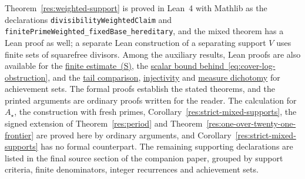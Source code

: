 \documentclass[11pt]{article}
\begin{document}
\evidenceparagraph{\evidencerecordurl}
Theorem~\ref{res:weighted-support} is proved in Lean~4 with Mathlib as
the declarations \texttt{divisibilityWeightedClaim} and
\texttt{finitePrimeWeighted\_fixedBase\_hereditary}, and the mixed
theorem has a Lean proof as well; a separate Lean construction of a
separating support $V$ uses finite sets of squarefree divisors. Among
the auxiliary results, Lean proofs are also available for the
\href{https://github.com/wcook04/plectis-erdos/blob/c91562bd574a387cde904481e609c7b4cacebb14/lean/ErdosProblems/Erdos257/PaperCompleteR8/DyadicKernel.lean\#L206}{finite estimate~(S)}, the
\href{https://github.com/wcook04/plectis-erdos/blob/c91562bd574a387cde904481e609c7b4cacebb14/lean/ErdosProblems/Erdos257/PaperCompleteR7/CoverKernel.lean\#L170}{scalar bound behind~\eqref{eq:cover-log-obstruction}},
and the \href{https://github.com/wcook04/plectis-erdos/blob/c91562bd574a387cde904481e609c7b4cacebb14/lean/ErdosProblems/Erdos257/MersenneSubseriesRigidity.lean\#L30}{tail comparison},
\href{https://github.com/wcook04/plectis-erdos/blob/c91562bd574a387cde904481e609c7b4cacebb14/lean/ErdosProblems/Erdos257/MersenneSubseriesRigidity.lean\#L54}{injectivity} and
\href{https://github.com/wcook04/plectis-erdos/blob/c91562bd574a387cde904481e609c7b4cacebb14/lean/ErdosProblems/Erdos257/MersenneSubseriesRigidity.lean\#L397}{measure dichotomy} for achievement sets. The
formal proofs establish the stated theorems, and the printed arguments
are ordinary proofs written for the reader. The calculation for
$A_\star$, the construction with fresh primes,
Corollary~\ref{res:strict-mixed-supports}, the signed extension of
Theorem~\ref{res:period} and Theorem~\ref{res:one-over-twenty-one-frontier}
are proved here by ordinary arguments, and
Corollary~\ref{res:strict-mixed-supports} has no formal counterpart.
The remaining supporting declarations are listed in
{the final source section of the companion paper}, grouped by support
criteria, finite denominators, integer recurrences and achievement sets.
\end{document}
